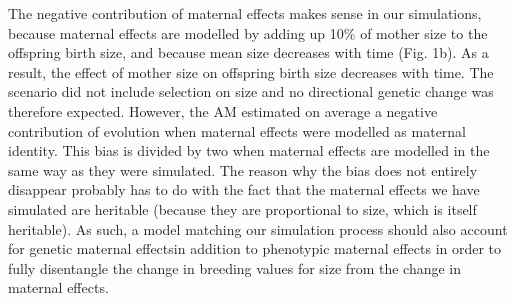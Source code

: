 The negative contribution of maternal effects makes sense in our simulations, because maternal effects are modelled by adding up 10\% of mother size to the offspring birth size, and because mean size decreases with time (Fig. 1b). As a result, the effect of mother size on offspring birth size decreases with time. 
The scenario \sh did not include selection on size and no directional genetic change was therefore expected. However, the AM estimated on average a negative contribution of evolution when maternal effects were modelled as maternal identity. 
This bias is divided by two when maternal effects are modelled in the same way as they were simulated. The reason why the bias does not entirely disappear probably has to do with the fact that the maternal effects we have simulated are heritable (because they are proportional to size, which is itself heritable). As such, a model matching our simulation process should also account for genetic maternal effects\textemdash in addition to phenotypic maternal effects\textemdash \parencite{Mcglothlin2014} in order to fully disentangle the change in breeding values for size from the change in maternal effects.

